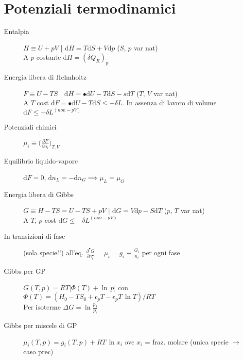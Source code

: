 \documentclass[10pt, oneside]{article}
\begin{document}
\section{Potenziali termodinamici}
\begin{description}
\item[Entalpia] $\displaystyle H \equiv U + pV$ \bigg| $\displaystyle \mathrm{d}H = T\mathrm{d}S + V \mathrm{d}p$ ($S, \, p$ var nat)
\\A $p$ costante $\mathrm{d}H = (\delta Q_R)_p$
\item[Energia libera di Helmholtz] $\displaystyle F \equiv U - TS$ \bigg| $\displaystyle \mathrm{d}H = •\mathrm{d}U - T\mathrm{d}S - s\mathrm{d}T$ ($T, \, V$ var nat)
\\A $T$ cost $\displaystyle \mathrm{d}F = •\mathrm{d}U - T\mathrm{d}S \leq - \delta L$. In assenza di lavoro di volume $\displaystyle \mathrm{d}F \leq - \delta L^{(non-pV)}$
\item[Potenziali chimici] $\displaystyle \mu_i \equiv \bigg(\frac{\partial F}{\partial n_i}\bigg)_{T,V}$
\item[Equilibrio liquido-vapore] $\displaystyle \mathrm{d}F = 0$, $\displaystyle \mathrm{d}n_L = - \mathrm{d}n_G \implies \displaystyle \mu_L = \mu_G$
\item[Energia libera di Gibbs] $\displaystyle G \equiv H -TS = U -TS + pV$ \bigg| $\displaystyle \mathrm{d}G = V\mathrm{d}p - S\mathrm{d}T$ ($p, \, T$ var nat)
\\A $T$, $p$ cost $\displaystyle \mathrm{d}G \leq - \delta L^{(non-pV)}$
\item[In transizioni di fase] (sola specie!!) all'eq. $\displaystyle \frac{\partial^{•} G}{\partial n_i^{•}} = \mu_i = g_i \equiv \frac{G_i}{n_i}$ per ogni fase
\item[Gibbs per GP] $\displaystyle G(T,p) = RT\big[\Phi(T) + \ln \, p\big]$ con $\displaystyle \Phi(T) = (H_0 - TS_0 + \mathcal{c}_p T - \mathcal{c}_p T \, \ln T)/RT$
\\Per isoterme $\displaystyle \Delta G = \ln \frac{p_f}{p_i}$
\item[Gibbs per miscele di GP] $\displaystyle \mu_i(T,p) = g_i(T,p) + RT \,\ln x_i$ ove $x_i$ = fraz. molare (unica specie $\rightarrow$ caso prec)

\end{description}
\end{document}

